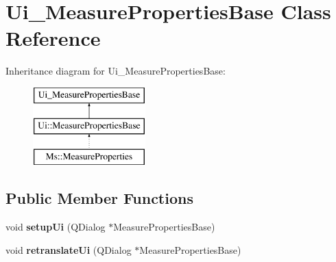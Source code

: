 \hypertarget{class_ui___measure_properties_base}{}\section{Ui\+\_\+\+Measure\+Properties\+Base Class Reference}
\label{class_ui___measure_properties_base}
Inheritance diagram for Ui\+\_\+\+Measure\+Properties\+Base\+:\begin{figure}[H]
\begin{center}
\leavevmode
\includegraphics[height=3.000000cm]{class_ui___measure_properties_base}
\end{center}
\end{figure}
\subsection*{Public Member Functions}
\begin{DoxyCompactItemize}
\item 
\mbox{\label{class_ui___measure_properties_base_aae483c8b07d21676c07d5b9cd1acfb0a}} 
void {\bfseries setup\+Ui} (Q\+Dialog $\ast$Measure\+Properties\+Base)
\item 
\mbox{\label{class_ui___measure_properties_base_a0ad067883b8a98fcbc8490152c70e547}} 
void {\bfseries retranslate\+Ui} (Q\+Dialog $\ast$Measure\+Properties\+Base)
\end{DoxyCompactItemize}
